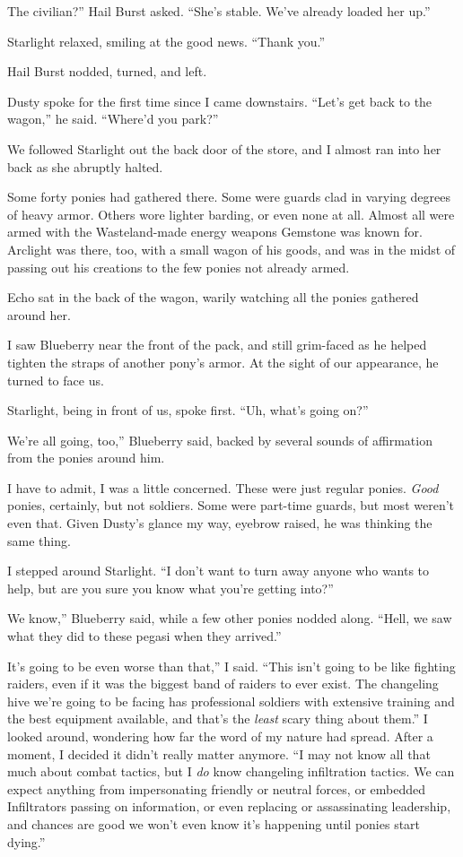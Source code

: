 \leavevmode{}The civilian?” Hail Burst asked. “She’s stable. We’ve already loaded her up.”

Starlight relaxed, smiling at the good news. “Thank you.”

Hail Burst nodded, turned, and left.

Dusty spoke for the first time since I came downstairs. “Let’s get back to the wagon,” he said. “Where’d you park?”

We followed Starlight out the back door of the store, and I almost ran into her back as she abruptly halted.

Some forty ponies had gathered there. Some were guards clad in varying degrees of heavy armor. Others wore lighter barding, or even none at all. Almost all were armed with the Wasteland-made energy weapons Gemstone was known for. Arclight was there, too, with a small wagon of his goods, and was in the midst of passing out his creations to the few ponies not already armed.

Echo sat in the back of the wagon, warily watching all the ponies gathered around her.

I saw Blueberry near the front of the pack, and still grim-faced as he helped tighten the straps of another pony’s armor. At the sight of our appearance, he turned to face us.

Starlight, being in front of us, spoke first. “Uh, what’s going on?”

\leavevmode{}We’re all going, too,” Blueberry said, backed by several sounds of affirmation from the ponies around him.

I have to admit, I was a little concerned. These were just regular ponies. \textit{Good} ponies, certainly, but not soldiers. Some were part-time guards, but most weren’t even that. Given Dusty’s glance my way, eyebrow raised, he was thinking the same thing.

I stepped around Starlight. “I don’t want to turn away anyone who wants to help, but are you sure you know what you’re getting into?”

\leavevmode{}We know,” Blueberry said, while a few other ponies nodded along. “Hell, we saw what they did to these pegasi when they arrived.”

\leavevmode{}It’s going to be even worse than that,” I said. “This isn’t going to be like fighting raiders, even if it was the biggest band of raiders to ever exist. The changeling hive we’re going to be facing has professional soldiers with extensive training and the best equipment available, and that’s the \textit{least} scary thing about them.” I looked around, wondering how far the word of my nature had spread. After a moment, I decided it didn’t really matter anymore. “I may not know all that much about combat tactics, but I \textit{do} know changeling infiltration tactics. We can expect anything from impersonating friendly or neutral forces, or embedded Infiltrators passing on information, or even replacing or assassinating leadership, and chances are good we won’t even know it’s happening until ponies start dying.”


